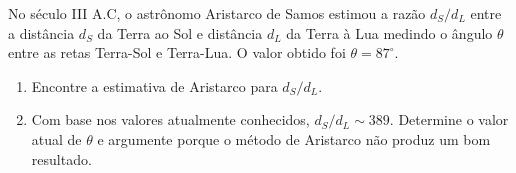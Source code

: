 \begin{prob}
	No século III A.C, o astrônomo Aristarco de Samos estimou a razão $d_{S}/d_{L}$ entre a distância $d_{S}$ da Terra ao Sol e distância $d_{L}$ da Terra à Lua medindo o ângulo $\theta$ entre as retas Terra-Sol e Terra-Lua. O valor obtido foi $\theta=87^{\circ}$.
	\begin{enumerate}[label=\alph *)]
		\item Encontre a estimativa de Aristarco para $d_{S}/d_{L}$.
		\item Com base nos valores atualmente conhecidos, $d_{S}/d_{L}\sim 389$. Determine o valor atual de $\theta$ e argumente porque o método de Aristarco não produz um bom resultado.
	\end{enumerate}
\end{prob}

